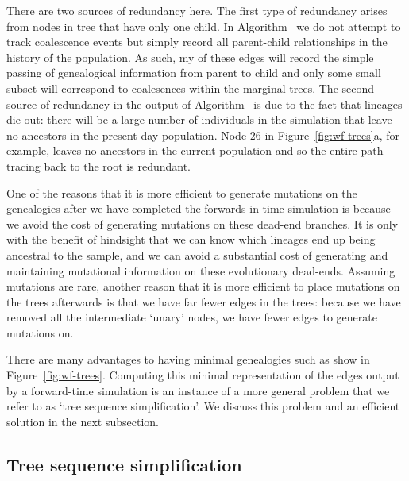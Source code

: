 \documentclass{article}
\begin{document}
There are two sources of redundancy here. The first type of redundancy arises
from nodes in tree that have only one child. In Algorithm~ we do
not attempt to track coalescence events but simply record all parent-child
relationships in the history of the population. As such, my of these edges
will record the simple passing of genealogical information from parent to child
and only some small subset will correspond to coalesences within the marginal
trees. The second source of redundancy in the output of Algorithm~
is due to the fact that lineages die out: there will be a large number of
individuals in the simulation that leave no ancestors in the present day
population. Node 26 in Figure~\ref{fig:wf-trees}a, for example, leaves no
ancestors in the current population and so the entire path tracing back to
the root is redundant.

One of the reasons that it is more efficient to generate mutations on the
genealogies after we have completed the forwards in time simulation is
because we avoid the cost of generating mutations on these dead-end branches.
It is only with the benefit of hindsight that we can know which lineages end
up being ancestral to the sample, and we can avoid a substantial cost of
generating and maintaining mutational information on these evolutionary
dead-ends. Assuming mutations are rare, another  reason that it is more efficient
to place mutations on the trees afterwards is that we have far fewer edges
in the trees: because we have removed all the intermediate `unary' nodes, we
have fewer edges to generate mutations on.

There are many advantages to having minimal genealogies such as show in
Figure~\ref{fig:wf-trees}. Computing this minimal representation of the
edges output by a forward-time simulation is an instance of a more
general problem that we refer to as `tree sequence simplification'. We discuss
this problem and an efficient solution in the next subsection.

\subsection*{Tree sequence simplification}
\end{document}
